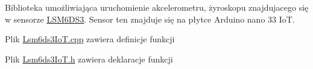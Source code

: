 Biblioteka umożliwiająca uruchomienie akcelerometru, żyroskopu znajdujacego się w sensorze \mbox{\hyperlink{class_l_s_m6_d_s3}{LSM6\+DS3}}. Sensor ten znajduje się na płytce Arduino nano 33 IoT.
\begin{DoxyItemize}
\item Plik \mbox{\hyperlink{_lsm6ds3_io_t_8cpp}{Lsm6ds3\+Io\+T.\+cpp}} zawiera definicje funkcji
\item Plik \mbox{\hyperlink{_lsm6ds3_io_t_8h}{Lsm6ds3\+Io\+T.\+h}} zawiera deklaracje funkcji 
\end{DoxyItemize}